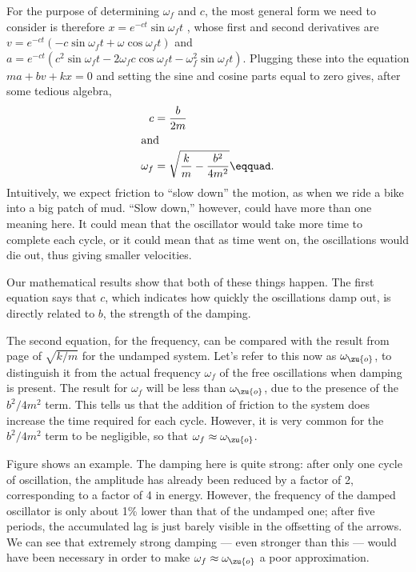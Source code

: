 \begin{listing}{1}
        For the purpose
        of determining $\omega_f$ and $c$, the
        most general form we need to consider is therefore
        $x = e^{-ct}\sin \omega_f t$ ,
        whose first and second derivatives are
        $v = e^{-ct}\left(-c \sin \omega_f t + \omega\cos \omega_f t\right) $
        and        $a = e^{-ct}\left(c^2 \sin \omega_f t 
                        -2\omega_f c \cos \omega_f t 
                        -\omega_f^2\sin \omega_f t\right)$.
        Plugging these into the equation $ma+bv+kx = 0$ and setting the sine and
        cosine parts equal to zero gives, after some tedious algebra,
        \begin{align*}
                c        &= \frac{b}{2m} \\
        \intertext{and}
                \omega_f        &= \sqrt{\frac{k}{m}-\frac{b^2}{4m^2}}\eqquad.
        \end{align*}
        Intuitively, we expect friction to ``slow down'' the motion, as when we ride a bike
        into a big patch of mud. ``Slow down,'' however, could have more than one meaning here. It
        could mean that the oscillator would take more time to complete each cycle, or it could
        mean that as time went on, the oscillations would die out, thus giving smaller velocities.

        Our mathematical results show that both of these things happen. 
        The first equation says that $c$, which indicates how quickly the
        oscillations damp out, is directly related to $b$, the strength of the damping.

        The second equation, for the frequency, can be compared with the result from page
        \pageref{sec:shm-k-m} of $\sqrt{k/m}$ for the undamped system.
        Let's refer to this now as $\omega_\zu{o}$, to distinguish it from the actual frequency
        $\omega_f$ of the free oscillations when damping is present. The result for
        $\omega_f$ will be less than $\omega_\zu{o}$, due to the presence of the $b^2/4m^2$ term.
        This tells us that the addition of friction to the system does increase the time required
        for each cycle. However, it is very common for the
        $b^2/4m^2$ term to be negligible, so that $\omega_f\approx\omega_\zu{o}$.

        Figure  shows an example. The damping here is quite strong:
        after only one cycle of oscillation, the amplitude has already been reduced by a factor of 2,
        corresponding to a factor of 4 in energy. However, the frequency of the damped oscillator is
        only about 1\% lower than that of the undamped one; after five periods, the accumulated lag is just barely visible in the offsetting
        of the arrows. We can see that extremely strong damping --- even stronger than this --- would have
        been necessary in order to make $\omega_f\approx\omega_\zu{o}$ a poor approximation.


\end{listing}
